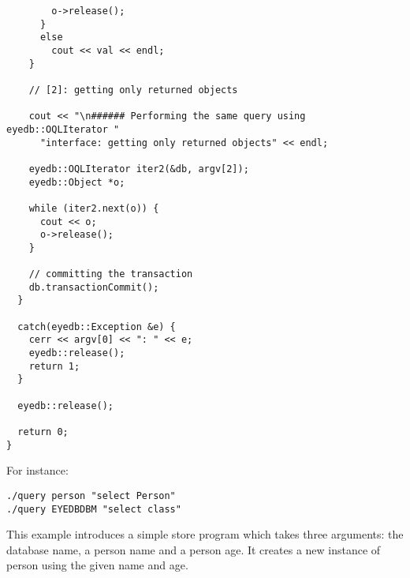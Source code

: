 \begin{verbatim}
        o->release();
      }
      else
        cout << val << endl;
    }

    // [2]: getting only returned objects

    cout << "\n###### Performing the same query using eyedb::OQLIterator "
      "interface: getting only returned objects" << endl;

    eyedb::OQLIterator iter2(&db, argv[2]);
    eyedb::Object *o;

    while (iter2.next(o)) {
      cout << o;
      o->release();
    }

    // committing the transaction
    db.transactionCommit();
  }

  catch(eyedb::Exception &e) {
    cerr << argv[0] << ": " << e;
    eyedb::release();
    return 1;
  }

  eyedb::release();

  return 0;
}
\end{verbatim}
For instance:
\begin{verbatim}
./query person "select Person"
./query EYEDBDBM "select class"
\end{verbatim}
\normalsize
{}
This example introduces a simple store program which takes
three arguments: the database name, a person name and a person age. It
creates a new instance of person using the given name and age.
\verbsize
